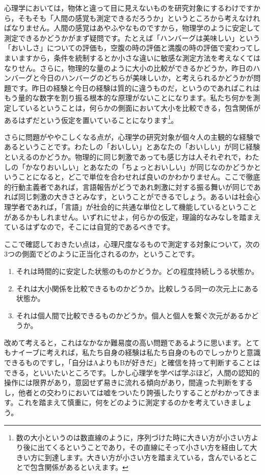 \documentclass{ltjsbook}
\begin{document}
心理学においては，物体と違って目に見えないものを研究対象にするわけですから，そもそも「人間の感覚も測定できるだろうか」というところから考えなければなりません。人間の感覚はあやふやなものですから，物理学のように安定して測定できるかどうかがまず疑問です。たとえば「ハンバーグは美味しい」という「おいしさ」についての評価も，空腹の時の評価と満腹の時の評価で変わってしまいますから，条件を統制するとか小さな違いに敏感な測定方法を考えなくてはなりせん。さらに，物理的な量のように大小の比較ができるかどうか，昨日のハンバーグと今日のハンバーグのどちらが美味しいか，と考えられるかどうかが問題です。昨日の経験と今日の経験は質的に違うものだ，というのであればこれはもう量的な数字を割り振る根本的な原理がないことになります。私たち何かを測定しているということは，何らかの側面において大小を比較できる，包含関係があるはずだという仮定を置いていることになります\footnote{数の大小というのは数直線のように，序列づけた時に大きい方が小さい方より後に出てくるということであり，その直線にそって小さい方を経由して大きい方に到達します。大きい方が小さい方を踏まえている，含んでいるとことで包含関係があるといえます。}。

さらに問題がややこしくなる点が，心理学の研究対象が個々人の主観的な経験であるということです。わたしの「おいしい」とあなたの「おいしい」が同じ経験といえるのかどうか。物理的に同じ刺激であっても感じ方は人それぞれで，わたしの「かなりおいしい」とあなたの「ちょっとおいしい」が同じなのかどうかということになると，どこで単位を合わせれば良いのかわかりません。ここで徹底的行動主義者であれば，言語報告がどうであれ刺激に対する振る舞いが同じであれば同じ刺激の大きさとみなす，ということができるでしょう。あるいは社会心理学者であれば，「言語」が社会的に共通な単位として機能しているということがあるかもしれません。いずれにせよ，何らかの仮定，理論的なみなしを踏まえているはずなので，そこには自覚的であるべきです。

ここで確認しておきたい点は，心理尺度なるもので測定する対象について，次の3つの側面でどのように正当化されるのか，ということです。
\begin{enumerate}
	\item それは時間的に安定した状態のものかどうか。どの程度持続しうる状態か。
	\item それは大小関係を比較できるものかどうか。比較しうる同一の次元上にある状態か。
	\item それは個人間で比較できるものかどうか。個人と個人を繋ぐ次元があるかどうか。
\end{enumerate}

改めて考えると，これはなかなか難易度の高い問題であるように思います。とてもナイーブに考えれば，私たち自身の経験は私たち自身のものでしっかりと意識できるものですし，「自分はAよりもBが好きだ」と確信を持って判断することはできる，といいたいところです。しかし心理学を学べば学ぶほど，人間の認知的操作には限界があり，意図せず易きに流れる傾向があり，間違った判断をするし，他者との交わりにおいては嘘をついたり誇張したりすることがわかってきます。これを踏まえて慎重に，何をどのように測定するのかを考えていきましょう。
\end{document}
